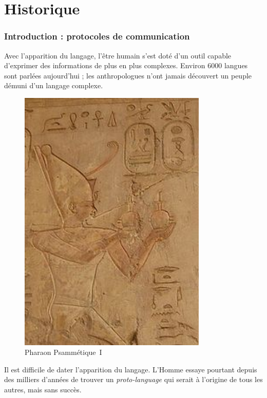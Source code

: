 
\part{Historique}\label{quoi}

\section*{Introduction : protocoles de communication}
Avec l'apparition du langage, l'être humain s'est doté d'un outil capable d'exprimer des informations de plus en plus complexes. Environ 6000 langues sont parlées aujourd'hui ; les anthropologues n'ont jamais découvert un peuple démuni d'un langage complexe\cite{linguistics-pinker}. 

\begin{minipage}[H]{0.49\linewidth}
  \begin{figure}[H]
  \centering
  \includegraphics[width=0.8\textwidth]{../resources/illustrations/psamtik-I}
  \caption{Pharaon Psammétique~I}
  \end{figure}
\end{minipage}
\begin{minipage}{0.5\linewidth}
Il est difficile de dater l'apparition du langage. L'Homme essaye pourtant depuis des milliers d'années de trouver un \emph{proto-language} qui serait à l'origine de tous les autres, mais sans succès. 
\vspace{1cm}
\end{minipage}


